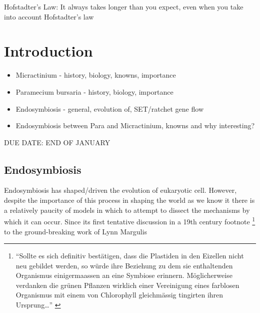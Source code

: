 \graphicspath{{chapters/1.Introduction/figures/}}

\begin{savequote}[75mm]
Hofstadter's Law: It always takes longer than you expect, even when you take into account Hofstadter's law
\end{savequote}

\chapter{Introduction}

\begin{itemize}
    \item Micractinium - history, biology, knowns, importance
    \item Paramecium bursaria - history, biology, importance
    \item Endosymbiosis - general, evolution of, SET/ratchet gene flow
    \item Endosymbiosis between Para and Micractinium, knowns and why interesting?
\end{itemize}

DUE DATE: END OF JANUARY

\section{Endosymbiosis}


Endosymbiosis has shaped/driven the evolution of eukaryotic cell.  %
However, despite the importance of this process in shaping the world as we know
it there is a relatively paucity of models in which to attempt to dissect the 
mechanisms by which it can occur. %
Since its first tentative discussion in a 19th century footnote
\footnote{``Sollte es sich definitiv best\"atigen, dass die Plastiden in den 
Eizellen nicht neu gebildet werden, so w\"urde ihre Beziehung zu dem sie 
enthaltenden Organismus einigermaassen an eine Symbiose erinnern. M\"oglicherweise
verdanken die gr\"unen Pflanzen wirklich einer Vereinigung eines farblosen Organismus
mit einem von Chlorophyll gleichm\"assig tingirten ihren Ursprung\ldots'' \citep{Schimper1883}} 
to the ground-breaking work of Lynn Margulis \citep{Sagan1967} 


